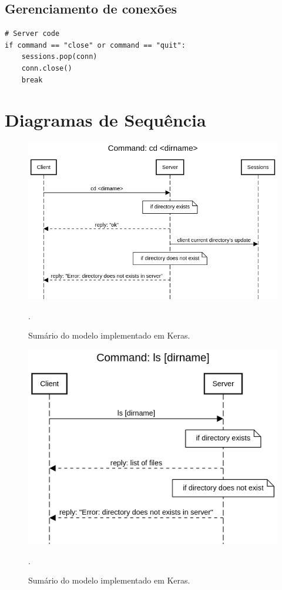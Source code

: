 \documentclass[conference]{IEEEtran}
\begin{document}
\subsection{Gerenciamento de conexões}

\begin{lstlisting}
# Server code
if command == "close" or command == "quit":
	sessions.pop(conn)
	conn.close()
	break
\end{lstlisting}

\section{Diagramas de Sequência}

\begin{figure}[htbp]
\centering
\centerline{\includegraphics[scale=0.3]{diagrams/Command_cd_dirname.png}}
\caption{Sumário do modelo implementado em Keras.}.
\label{summary}
\end{figure}

\begin{figure}[htbp]
\centering
\centerline{\includegraphics[scale=0.4]{diagrams/Command_ls_dirname.png}}
\caption{Sumário do modelo implementado em Keras.}.
\label{summary}
\end{figure}
\end{document}
